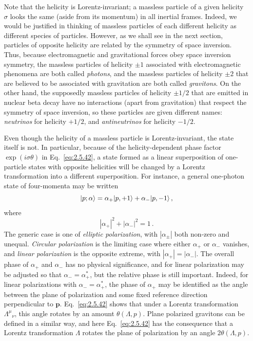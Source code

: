 Note that the helicity is Lorentz-invariant; a massless particle of a given
helicity $\sigma$ looks the same (aside from its momentum) in all inertial
frames. Indeed, we would be justified in thinking of massless particles of
each different helicity as different species of particles. However, as we
shall see in the next section, particles of opposite helicity are related by
the symmetry of space inversion. Thus, because electromagnetic and
gravitational forces obey space inversion symmetry, the massless particles of
helicity $\pm1$ associated with electromagnetic phenomena are both called
\emph{photons}, and the massless particles of helicity $\pm2$ that are believed
to be associated with gravitation are both called \emph{gravitons}. On the
other hand, the supposedly massless particles of helicity $\pm1/2$ that are
emitted in nuclear beta decay have no interactions (apart from gravitation)
that respect the symmetry of space inversion, so these particles are given
different names: \emph{neutrinos} for helicity $+1/2$, and
\emph{antineutrinos} for helicity $-1/2$.

Even though the helicity of a massless particle is Lorentz-invariant, the state
itself is not. In particular, because of the helicity-dependent phase factor
$\exp(i\sigma\theta)$ in Eq.~\eqref{eq:2.5.42}, a state formed as a linear superposition
of one-particle states with opposite helicities will be changed by a Lorentz
transformation into a different superposition. For instance, a general
one-photon state of four-momenta may be written
\[
\lvert p;\alpha\rangle=\alpha_+\lvert p,+1\rangle+\alpha_-\lvert p,-1\rangle\,,
\]
where
\[
|\alpha_+|^2+|\alpha_-|^2=1\,.
\]
The generic case is one of \emph{elliptic polarization}, with
$|\alpha_\pm|$ both non-zero and unequal. \emph{Circular polarization} is the
limiting case where either $\alpha_+$ or $\alpha_-$ vanishes, and
\emph{linear polarization} is the opposite extreme, with
$|\alpha_+|=|\alpha_-|$. The overall phase of $\alpha_+$ and $\alpha_-$ has no
physical significance, and for linear polarization may be adjusted so that
$\alpha_-=\alpha_+^*$, but the relative phase is still important. Indeed, for
linear polarizations with $\alpha_-=\alpha_+^*$, the phase of $\alpha_+$ may be
identified as the angle between the plane of polarization and some fixed
reference direction perpendicular to $\mathbf{p}$. Eq.~\eqref{eq:2.5.42} shows that
under a Lorentz transformation $\Lambda^\mu{}_{\nu}$, this angle rotates by an
amount $\theta(\Lambda,p)$. Plane polarized gravitons can be defined in a
similar way, and here Eq.~\eqref{eq:2.5.42} has the consequence that a Lorentz
transformation $\Lambda$ rotates the plane of polarization by an angle
$2\theta(\Lambda,p)$.
